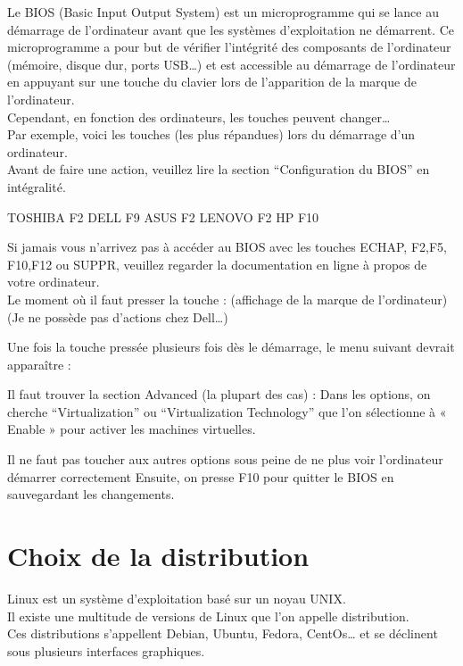 {Le BIOS (Basic Input Output System) est un microprogramme qui se lance au démarrage de l’ordinateur 
avant que les systèmes d’exploitation ne démarrent. Ce microprogramme a pour but de vérifier 
l’intégrité des composants de l’ordinateur (mémoire, disque dur, ports USB…) et est accessible au 
démarrage de l’ordinateur en appuyant sur une touche du clavier lors de l’apparition de la marque 
de l’ordinateur.\\

Cependant, en fonction des ordinateurs, les touches peuvent changer…\\
Par exemple, voici les touches (les plus répandues) lors du démarrage d’un ordinateur.\\
Avant de faire une action, veuillez lire la section “Configuration du BIOS” en intégralité.

TOSHIBA
F2
DELL
F9
ASUS
F2
LENOVO
F2
HP
F10


Si jamais vous n’arrivez pas à accéder au BIOS avec les touches ECHAP, F2,F5, F10,F12 ou SUPPR, 
veuillez regarder la documentation en ligne à propos de votre ordinateur.\\


Le moment où il faut presser la touche :
(affichage de la marque de l’ordinateur)
(Je ne possède pas d’actions chez Dell…)

Une fois la touche pressée plusieurs fois dès le démarrage, le menu suivant devrait apparaître :

Il faut trouver la section Advanced (la plupart des cas) :
Dans les options, on cherche “Virtualization” ou “Virtualization Technology” que l’on sélectionne à « Enable » pour activer les machines virtuelles.

Il ne faut pas toucher aux autres options sous peine de ne plus voir l’ordinateur démarrer correctement
Ensuite, on presse F10 pour quitter le BIOS en sauvegardant les changements.


\section{Choix de la distribution}

Linux est un système d’exploitation basé sur un noyau UNIX.\\
Il existe une multitude de versions de Linux que l’on appelle distribution.\\
Ces distributions s’appellent Debian, Ubuntu, Fedora, CentOs… et se déclinent sous plusieurs 
interfaces graphiques.\\

}
